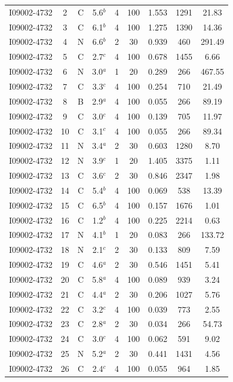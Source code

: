 \begin{table}
\begin{tabular}{ccccccccc}
I09002-4732 & 2 & C & 5.6$^{b}$ & 4 & 100 & 1.553 & 1291 & 21.83 \\
I09002-4732 & 3 & C & 6.1$^{b}$ & 4 & 100 & 1.275 & 1390 & 14.36 \\
I09002-4732 & 4 & N & 6.6$^{b}$ & 2 & 30 & 0.939 & 460 & 291.49 \\
I09002-4732 & 5 & C & 2.7$^{c}$ & 4 & 100 & 0.678 & 1455 & 6.66 \\
I09002-4732 & 6 & N & 3.0$^{a}$ & 1 & 20 & 0.289 & 266 & 467.55 \\
I09002-4732 & 7 & C & 3.3$^{c}$ & 4 & 100 & 0.254 & 710 & 21.49 \\
I09002-4732 & 8 & B & 2.9$^{a}$ & 4 & 100 & 0.055 & 266 & 89.19 \\
I09002-4732 & 9 & C & 3.0$^{c}$ & 4 & 100 & 0.139 & 705 & 11.97 \\
I09002-4732 & 10 & C & 3.1$^{c}$ & 4 & 100 & 0.055 & 266 & 89.34 \\
I09002-4732 & 11 & N & 3.4$^{a}$ & 2 & 30 & 0.603 & 1280 & 8.70 \\
I09002-4732 & 12 & N & 3.9$^{c}$ & 1 & 20 & 1.405 & 3375 & 1.11 \\
I09002-4732 & 13 & C & 3.6$^{c}$ & 2 & 30 & 0.846 & 2347 & 1.98 \\
I09002-4732 & 14 & C & 5.4$^{b}$ & 4 & 100 & 0.069 & 538 & 13.39 \\
I09002-4732 & 15 & C & 6.5$^{b}$ & 4 & 100 & 0.157 & 1676 & 1.01 \\
I09002-4732 & 16 & C & 1.2$^{b}$ & 4 & 100 & 0.225 & 2214 & 0.63 \\
I09002-4732 & 17 & N & 4.1$^{b}$ & 1 & 20 & 0.083 & 266 & 133.72 \\
I09002-4732 & 18 & N & 2.1$^{c}$ & 2 & 30 & 0.133 & 809 & 7.59 \\
I09002-4732 & 19 & C & 4.6$^{a}$ & 2 & 30 & 0.546 & 1451 & 5.41 \\
I09002-4732 & 20 & C & 5.8$^{a}$ & 4 & 100 & 0.089 & 939 & 3.24 \\
I09002-4732 & 21 & C & 4.4$^{a}$ & 2 & 30 & 0.206 & 1027 & 5.76 \\
I09002-4732 & 22 & C & 3.2$^{c}$ & 4 & 100 & 0.039 & 773 & 2.55 \\
I09002-4732 & 23 & C & 2.8$^{a}$ & 2 & 30 & 0.034 & 266 & 54.73 \\
I09002-4732 & 24 & C & 3.0$^{c}$ & 4 & 100 & 0.062 & 591 & 9.02 \\
I09002-4732 & 25 & N & 5.2$^{a}$ & 2 & 30 & 0.441 & 1431 & 4.56 \\
I09002-4732 & 26 & C & 2.4$^{c}$ & 4 & 100 & 0.055 & 964 & 1.85 \\

\end{tabular}
\end{table}
